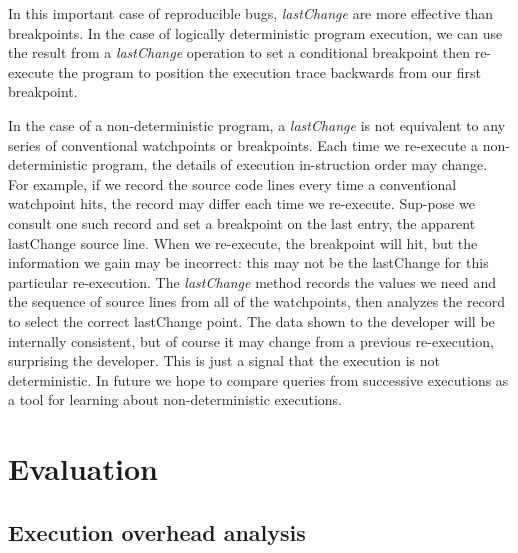 \documentclass[preprint]{sigplanconf}
\begin{document}
In this important case of reproducible bugs, \textit{lastChange} are more effective than breakpoints. In the case of logically deterministic program execution, we can use the result from a \textit{lastChange} operation to set a conditional breakpoint then re-execute the program to position the execution trace backwards from our first breakpoint. %

In the case of a non-deterministic program, a \textit{lastChange} is not equivalent to any series of conventional watchpoints or breakpoints. Each time we re-execute a non-deterministic program, the details of execution in-struction order may change. For example, if we record the source code lines every time a conventional watchpoint hits, the record may differ each time we re-execute. Sup-pose we consult one such record and set a breakpoint on the last entry, the apparent lastChange source line. When we re-execute, the breakpoint will hit, but the information we gain may be incorrect: this may not be the lastChange for this particular re-execution. The \textit{lastChange} method records the values we need and the sequence of source lines from all of the watchpoints, then analyzes the record to select the correct lastChange point. The data shown to the developer will be internally consistent, but of course it may change from a previous re-execution, surprising the developer. This is just a signal that the execution is not deterministic. In future we hope to compare queries from successive executions as a tool for learning about non-deterministic executions.

\section{Evaluation}
\subsection{Execution overhead analysis}
\end{document}
